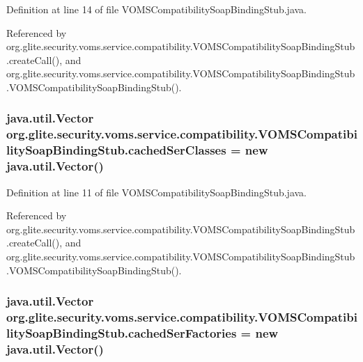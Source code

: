 Definition at line 14 of file VOMSCompatibilitySoapBindingStub.java.



Referenced by org.glite.security.voms.service.compatibility.VOMSCompatibilitySoapBindingStub.createCall(), and org.glite.security.voms.service.compatibility.VOMSCompatibilitySoapBindingStub.VOMSCompatibilitySoapBindingStub().

\hypertarget{classorg_1_1glite_1_1security_1_1voms_1_1service_1_1compatibility_1_1VOMSCompatibilitySoapBindingStub_a354e5119bad8de7a44b3e9442cebbe58}{
\subsubsection[{cachedSerClasses}]{\setlength{\rightskip}{0pt plus 5cm}java.util.Vector {\bf org.glite.security.voms.service.compatibility.VOMSCompatibilitySoapBindingStub.cachedSerClasses} = new java.util.Vector()}}
\label{classorg_1_1glite_1_1security_1_1voms_1_1service_1_1compatibility_1_1VOMSCompatibilitySoapBindingStub_a354e5119bad8de7a44b3e9442cebbe58}


Definition at line 11 of file VOMSCompatibilitySoapBindingStub.java.



Referenced by org.glite.security.voms.service.compatibility.VOMSCompatibilitySoapBindingStub.createCall(), and org.glite.security.voms.service.compatibility.VOMSCompatibilitySoapBindingStub.VOMSCompatibilitySoapBindingStub().

\hypertarget{classorg_1_1glite_1_1security_1_1voms_1_1service_1_1compatibility_1_1VOMSCompatibilitySoapBindingStub_a20f074b50692c5f32acd55324b5b98fc}{
\subsubsection[{cachedSerFactories}]{\setlength{\rightskip}{0pt plus 5cm}java.util.Vector {\bf org.glite.security.voms.service.compatibility.VOMSCompatibilitySoapBindingStub.cachedSerFactories} = new java.util.Vector()}}
\label{classorg_1_1glite_1_1security_1_1voms_1_1service_1_1compatibility_1_1VOMSCompatibilitySoapBindingStub_a20f074b50692c5f32acd55324b5b98fc}


